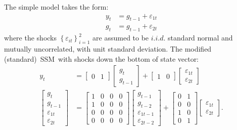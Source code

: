 \documentclass[a4paper,12pt]{article}
\newcommand{\bsq}{\begin{subequations}}\newcommand{\esq}{\end{subequations}}
\begin{document}
The simple model takes the form:\bsq\label{clark0}%
\begin{align}
y_{t}& =g_{t-1}+\varepsilon _{1t} \\
g_{t}& =g_{t-1}+\varepsilon _{2t}
\end{align}%
\esq where the shocks $\left\{ \varepsilon _{it}\right\} _{i=1}^{2}$ are
assumed to be $i.i.d.$ standard normal and mutually uncorrelated, with unit
standard deviation. The modified (standard)\ SSM\ with shocks down the
bottom of state vector:%
\begin{align}
y_{t}& =%
\begin{bmatrix}
0 & 1%
\end{bmatrix}%
\begin{bmatrix}
g_{t} \\ 
g_{t-1}%
\end{bmatrix}%
+%
\begin{bmatrix}
1 & 0%
\end{bmatrix}%
\begin{bmatrix}
\varepsilon _{1t} \\ 
\varepsilon _{2t}%
\end{bmatrix}
\\[4mm]
\begin{bmatrix}
g_{t} \\ 
g_{t-1} \\ 
\varepsilon _{1t} \\ 
\varepsilon _{2t}%
\end{bmatrix}%
& =%
\begin{bmatrix}
1 & 0 & 0 & 0 \\ 
1 & 0 & 0 & 0 \\ 
0 & 0 & 0 & 0 \\ 
0 & 0 & 0 & 0%
\end{bmatrix}%
\begin{bmatrix}
g_{t-1} \\ 
g_{t-2} \\ 
\varepsilon _{1t-1} \\ 
\varepsilon _{2t-2}%
\end{bmatrix}%
+%
\begin{bmatrix}
0 & 1 \\ 
0 & 0 \\ 
1 & 0 \\ 
0 & 1%
\end{bmatrix}%
\begin{bmatrix}
\varepsilon _{1t} \\ 
\varepsilon _{2t}%
\end{bmatrix}%
.
\end{align}
\end{document}
